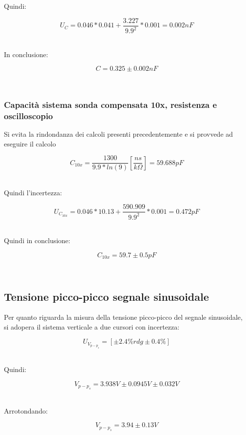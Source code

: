 \documentclass[a4paper]{article}
\begin{document}
Quindi:
\begin{Large}
	\begin{equation}
		{U_C}= 0.046*0.041+\frac{3.227}{9.9^2}*0.001=0.002 nF
	\end{equation}
\end{Large}\\

In conclusione: 
\begin{Large}
	\begin{equation}
		C=0.325\pm 0.002nF
	\end{equation}
\end{Large}\\

\subsubsection{Capacità sistema sonda compensata 10x, resistenza e oscilloscopio }
Si evita la rindondanza dei calcoli presenti precedentemente e si provvede ad eseguire il calcolo
\begin{Large}
	\begin{equation}
  		C_{10x}= \frac{1300}{9.9*ln(9)} [\frac{ns}{k\Omega}]= 59.688pF
	\end{equation}
\end{Large}\\

Quindi l'incertezza:
\begin{Large}
	\begin{equation}
		{U_{C_{10x}}}= 0.046*10.13+\frac{590.909}{9.9^2}*0.001=0.472 pF
	\end{equation}
\end{Large}\\

Quindi in conclusione:
\begin{Large}
	\begin{equation}
		{C_{10x}}= 59.7 \pm0.5 pF
	\end{equation}
\end{Large}\\

\subsection{Tensione picco-picco segnale sinusoidale} %
Per quanto riguarda la misura della tensione picco-picco del segnale sinusoidale, si adopera il sistema verticale a due cursori con incertezza:
\begin{Large}
	\begin{equation}
		U_{V_{p-p_{s}}}= [\pm 2.4\% rdg\pm 0.4\%]
	\end{equation}
\end{Large}\\

Quindi: 
\begin{Large}
	\begin{equation}
		V_{p-p_{s}}= 3.938V\pm 0.0945V\pm 0.032V
	\end{equation}
\end{Large}\\

Arrotondando:
\begin{Large}
	\begin{equation}
		V_{p-p_{s}}= 3.94\pm 0.13V
\end{equation}
\end{Large}\\
\end{document}
